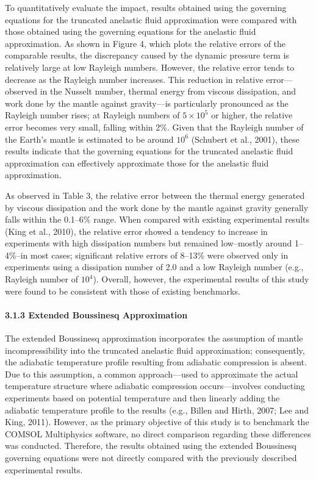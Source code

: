 To quantitatively evaluate the impact, results obtained using the governing equations for the truncated anelastic fluid approximation were compared with those obtained using the governing equations for the anelastic fluid approximation. As shown in Figure 4, which plots the relative errors of the comparable results, the discrepancy caused by the dynamic pressure term is relatively large at low Rayleigh numbers. However, the relative error tends to decrease as the Rayleigh number increases. This reduction in relative error—observed in the Nusselt number, thermal energy from viscous dissipation, and work done by the mantle against gravity—is particularly pronounced as the Rayleigh number rises; at Rayleigh numbers of $5 \times 10^5$ or higher, the relative error becomes very small, falling within 2\%. Given that the Rayleigh number of the Earth's mantle is estimated to be around $10^6$ (Schubert et al., 2001), these results indicate that the governing equations for the truncated anelastic fluid approximation can effectively approximate those for the anelastic fluid approximation.

As observed in Table 3, the relative error between the thermal energy generated by viscous dissipation and the work done by the mantle against gravity generally falls within the 0.1–6\% range. When compared with existing experimental results (King et al., 2010), the relative error showed a tendency to increase in experiments with high dissipation numbers but remained low--mostly around 1–4\%--in most cases; significant relative errors of 8–13\% were observed only in experiments using a dissipation number of 2.0 and a low Rayleigh number (e.g., Rayleigh number of $10^4$). 
Overall, however, the experimental results of this study were found to be consistent with those of existing benchmarks.

\paragraph{3.1.3 Extended Boussinesq Approximation}


The extended Boussinesq approximation incorporates the assumption of mantle incompressibility into the truncated anelastic fluid approximation; consequently, the adiabatic temperature profile resulting from adiabatic compression is absent. Due to this assumption, a common approach—used to approximate the actual temperature structure where adiabatic compression occurs—involves conducting experiments based on potential temperature and then linearly adding the adiabatic temperature profile to the results (e.g., Billen and Hirth, 2007; Lee and King, 2011). However, as the primary objective of this study is to benchmark the COMSOL Multiphysics software, no direct comparison regarding these differences was conducted. Therefore, the results obtained using the extended Boussinesq governing equations were not directly compared with the previously described experimental results.

